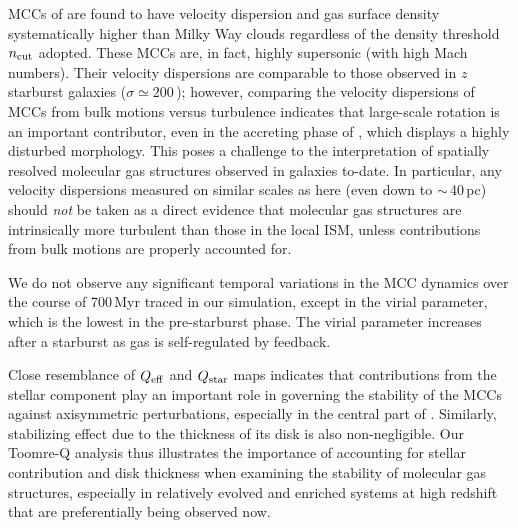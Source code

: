 \IfFileExists{emulateapjlegacy.cls}{\documentclass[iop]{emulateapjlegacy}}{\documentclass[iop]{emulateapj}}
\begin{document}
MCCs of \flower are found to have velocity dispersion and gas surface density systematically higher than 
Milky Way clouds regardless of the density threshold $n_{\rm cut}$ adopted. 
These MCCs are, in fact, highly supersonic (with high Mach numbers).
Their velocity dispersions are comparable to those observed in $z$ starburst galaxies ($\sigma\simeq200$\,\kms); however, 
comparing the velocity dispersions of MCCs from bulk motions versus turbulence 
indicates that large-scale rotation is an important contributor, even in the 
accreting phase of \flower, which displays a highly disturbed morphology. 
This poses a challenge to the interpretation of spatially resolved molecular gas structures observed in \highz galaxies to-date. 
In particular, any velocity dispersions measured on similar scales as here (even down to $\sim$\,40\,pc) 
should {\em not} be taken as a direct evidence that \highz molecular gas structures are intrinsically more turbulent than those in the local ISM, 
unless contributions from bulk motions are properly accounted for.

We do not observe any significant temporal variations in the MCC dynamics over the course of 700\,Myr
traced in our simulation, except in the virial parameter, which is the lowest in the pre-starburst phase. 
The virial parameter increases after a starburst as gas is self-regulated by feedback.

Close resemblance of $Q_{\rm eff}$ and $Q_{\rm star}$ maps 
indicates that contributions from the stellar component play an important role in governing the stability of the MCCs against
axisymmetric perturbations, especially in the central part of \flower. Similarly, stabilizing effect due to the thickness of its disk is also 
non-negligible. Our Toomre-Q analysis thus illustrates the importance of accounting for stellar contribution 
and disk thickness when examining the stability of 
molecular gas structures, especially in relatively evolved and enriched systems at high redshift that are preferentially being observed now.
 
\end{document}
